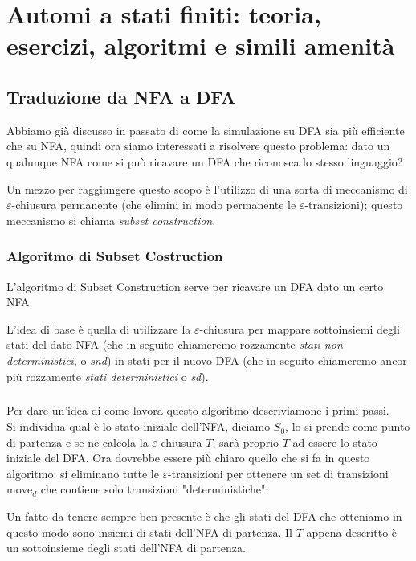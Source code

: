 \documentclass[class=book, crop=false, oneside, 12pt]{standalone}
\begin{document}
\chapter[Automi: teoria, esercizi, algoritmi e amenità]{Automi a stati finiti: teoria, esercizi, algoritmi e simili amenità}

\section{Traduzione da NFA a DFA}
Abbiamo già discusso in passato di come la simulazione su DFA sia più efficiente che su NFA, quindi ora siamo interessati a risolvere questo problema: dato un qualunque NFA come si può ricavare un DFA che riconosca lo stesso linguaggio?

Un mezzo per raggiungere questo scopo è l’utilizzo di una sorta di meccanismo di \(\varepsilon\)-chiusura permanente (che elimini in modo permanente le \(\varepsilon\)-transizioni); questo meccanismo si chiama \emph{subset construction}.


\subsection{Algoritmo di Subset Costruction}
L’algoritmo di Subset Construction serve per ricavare un DFA dato un certo NFA.

L'idea di base è quella di utilizzare la \(\varepsilon\)-chiusura per mappare sottoinsiemi degli stati del dato NFA (che in seguito chiameremo rozzamente \emph{stati non deterministici}, o \emph{snd}) in stati per il nuovo DFA (che in seguito chiameremo ancor più rozzamente \emph{stati deterministici} o \emph{sd}).

\paragraph{}
Per dare un'idea di come lavora questo algoritmo descriviamone i primi passi.\\
Si individua qual è lo stato iniziale dell'NFA, diciamo \(S_0\), lo si prende come punto di partenza e se ne calcola la \(\varepsilon\)-chiusura \(T\); sarà proprio \(T\) ad essere lo stato iniziale del DFA. Ora dovrebbe essere più chiaro quello che si fa in questo algoritmo: si eliminano tutte le \(\varepsilon\)-transizioni per ottenere un set di transizioni \(\textrm{move}_d\) che contiene solo transizioni "deterministiche".

Un fatto da tenere sempre ben presente è che gli stati del DFA che otteniamo in questo modo sono insiemi di stati dell'NFA di partenza. Il \(T\) appena descritto è un sottoinsieme degli stati dell'NFA di partenza.
\end{document}
